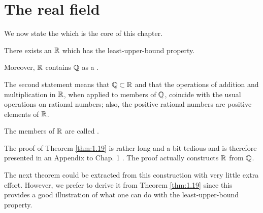 
\section{The real field}

We now state the  which is the core of this chapter.

\begin{thm}
    \label{thm:1.19}
    There exists an  ${\protect\mathbb R}$
    which has the least-upper-bound property.

    Moreover, ${\protect\mathbb R}$ contains ${\protect\mathbb Q} $ as a .
\end{thm}

The second statement means that ${\protect\mathbb Q} \subset {\protect\mathbb R}$
and that the operations of addition and multiplication in ${\protect\mathbb R}$,
when applied to members of ${\protect\mathbb Q} $,
coincide with the usual operations on rational numbers;
also, the positive rational numbers are positive elements of ${\protect\mathbb R}$.

The members of ${\protect\mathbb R}$ are called .

The proof of Theorem \ref{thm:1.19} is rather long and a bit tedious
and is therefore presented in an Appendix to Chap.
1 .
The proof actually constructs ${\protect\mathbb R}$ from ${\protect\mathbb Q}$.

The next theorem could be extracted from this construction with very little extra effort.
However, we prefer to derive it from Theorem \ref{thm:1.19} since this
provides a good illustration of what one can do with the least-upper-bound property.


